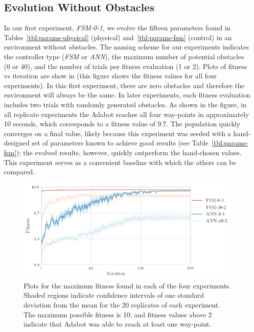\subsection{Evolution Without Obstacles}

In our first experiment, \emph{FSM-0-1}, we evolve the fifteen parameters found in Tables~\ref{tbl:params-physical} (physical) and~\ref{tbl:params-fsm} (control) in an environment without obstacles.
%
The naming scheme for our experiments indicates the controller type (\emph{FSM} or \emph{ANN}), the maximum number of potential obstacles (0 or 40), and the number of trials per fitness evaluation (1 or 2).
%
Plots of fitness vs iteration are show in  (this figure shows the fitness values for all four experiments).
%
In this first experiment, there are zero obstacles and therefore the environment will always be the same. In later experiments, each fitness evaluation includes two trials with randomly generated obstacles.
%
As shown in the figure, in all replicate experiments the Adabot reaches all four way-points in approximately 10 seconds, which corresponds to a fitness value of 9.7.
%
The population quickly converges on a final value, likely because this experiment was seeded with a hand-designed set of parameters known to achieve good results (see Table~\ref{tbl:params-fsm}); the evolved results, however, quickly outperform the hand-chosen values.
%
This experiment serves as a convenient baseline with which the others can be compared.

\begin{figure}[!ht]
    \centering

    \includegraphics[width=\columnwidth]{figures/4-results/fitness.png}

    \vspace{-0.1in}

    \caption{Plots for the maximum fitness found in each of the four experiments. Shaded regions indicate confidence intervals of one standard deviation from the mean for the 20 replicates of each experiment. The maximum possible fitness is 10, and fitness values above 2 indicate that Adabot was able to reach at least one way-point.}
    \label{fig:fitness-vs-iteration}

    \vspace{-0.1in}
\end{figure}


